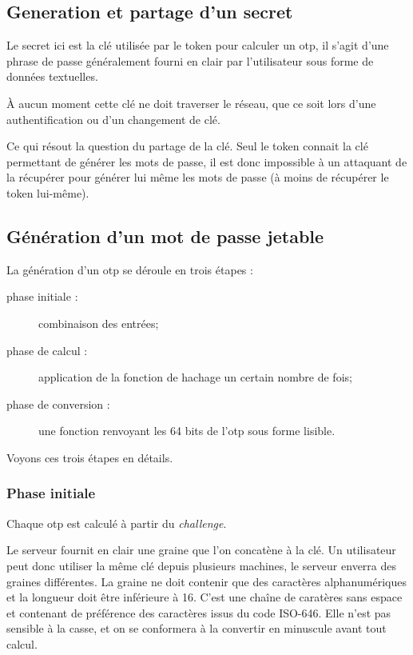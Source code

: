 \documentclass{../res/univ-projet}
\begin{document}
  \subsection{Generation et partage d'un secret}
    Le secret ici est la clé utilisée par le token pour calculer un otp, il 
s'agit d'une phrase de passe généralement fourni en clair par l'utilisateur 
sous forme de données textuelles. 

    À aucun moment cette clé ne doit traverser le réseau, que ce soit lors 
d'une authentification ou d'un changement de clé.

    Ce qui résout la question du partage de la clé. Seul le token connait la 
clé permettant de générer les mots de passe, il est donc impossible à un attaquant 
de la récupérer pour générer lui même les mots de passe (à moins de récupérer 
le token lui-même).

  \subsection{Génération d'un mot de passe jetable}

    La génération d'un otp se déroule en trois étapes :
    \begin{description}
      \item [phase initiale :] combinaison des entrées;
      \item [phase de calcul :] application de la fonction de hachage un 
      certain nombre de fois;
      \item [phase de conversion :] une fonction renvoyant les 64 bits de l'otp 
      sous forme lisible.\\
    \end{description}

    Voyons ces trois étapes en détails.

    \subsubsection{Phase initiale}
      Chaque otp est calculé à partir du \emph{challenge}.

      Le serveur fournit en clair une graine que l'on concatène à la clé. Un 
utilisateur peut donc utiliser la même clé depuis plusieurs machines, le serveur 
enverra des graines différentes. La graine ne doit contenir que des caractères 
alphanumériques et la longueur doit être inférieure à 16. C'est une chaîne de 
caratères sans espace et contenant de préférence des caractères issus du code 
ISO-646. Elle n'est pas sensible à la casse, et on se conformera à la convertir 
en minuscule avant tout calcul.
\end{document}
